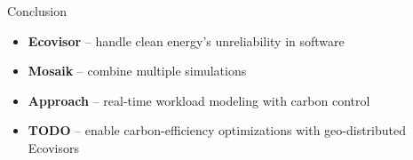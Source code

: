 \begin{frame}{Conclusion}
    \begin{itemize}
        \item \textbf{Ecovisor} -- handle clean energy's unreliability in
            software
        \item \textbf{Mosaik} -- combine multiple simulations
        \item[\arrow] \textbf{Approach} -- real-time workload modeling with
            carbon control
        \item[\arrow] \textbf{TODO} -- enable carbon-efficiency optimizations
            with geo-distributed Ecovisors
    \end{itemize}
\end{frame}
